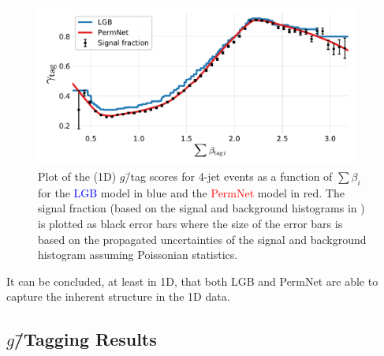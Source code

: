 \begin{figure}
  \centerfloat
  \includegraphics[width=0.95\textwidth, trim=10 10 10 20, clip]{figures/quarks/gtag_sum_models_njet=4-down_sample=1.00-ML_vars=vertex-selection=b-ejet_min=4-n_iter_RS_lgb=99-n_iter_RS_xgb=9-cdot_cut=0.90-version=19.pdf}
  \caption[1D Sum Models Predictions and Signal Fraction for 4-jets events]
          {Plot of the (1D) $g$\=/tag scores for 4-jet events as a function of $\sum \beta_i$ for the \textcolor{blue}{LGB} model in blue and the \textcolor{red}{PermNet} model in red. The signal fraction (based on the signal and background histograms in ) is plotted as black error bars where the size of the error bars is based on the propagated uncertainties of the signal and background histogram assuming Poissonian statistics. } 
  \label{fig:q:1d_sum_models_signal_fraction_4j}
\end{figure}

It can be concluded, at least in 1D, that both LGB and PermNet are able to capture the inherent structure in the 1D data. 


\subsection{$g$\=/Tagging Results}

